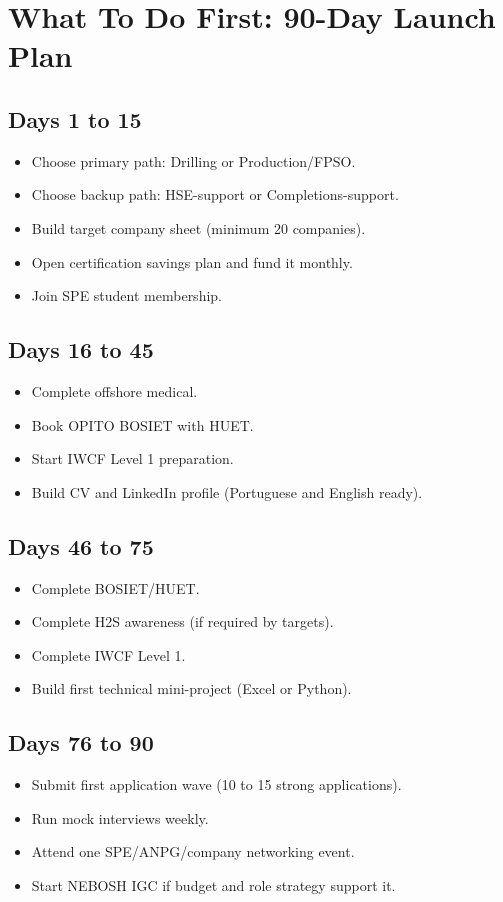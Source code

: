 \documentclass[11pt,openany]{book}
\begin{document}
\chapter{What To Do First: 90-Day Launch Plan}

\section{Days 1 to 15}
\begin{itemize}
  \item Choose primary path: Drilling or Production/FPSO.
  \item Choose backup path: HSE-support or Completions-support.
  \item Build target company sheet (minimum 20 companies).
  \item Open certification savings plan and fund it monthly.
  \item Join SPE student membership.
\end{itemize}

\section{Days 16 to 45}
\begin{itemize}
  \item Complete offshore medical.
  \item Book OPITO BOSIET with HUET.
  \item Start IWCF Level 1 preparation.
  \item Build CV and LinkedIn profile (Portuguese and English ready).
\end{itemize}

\section{Days 46 to 75}
\begin{itemize}
  \item Complete BOSIET/HUET.
  \item Complete H2S awareness (if required by targets).
  \item Complete IWCF Level 1.
  \item Build first technical mini-project (Excel or Python).
\end{itemize}

\section{Days 76 to 90}
\begin{itemize}
  \item Submit first application wave (10 to 15 strong applications).
  \item Run mock interviews weekly.
  \item Attend one SPE/ANPG/company networking event.
  \item Start NEBOSH IGC if budget and role strategy support it.
\end{itemize}
\end{document}
